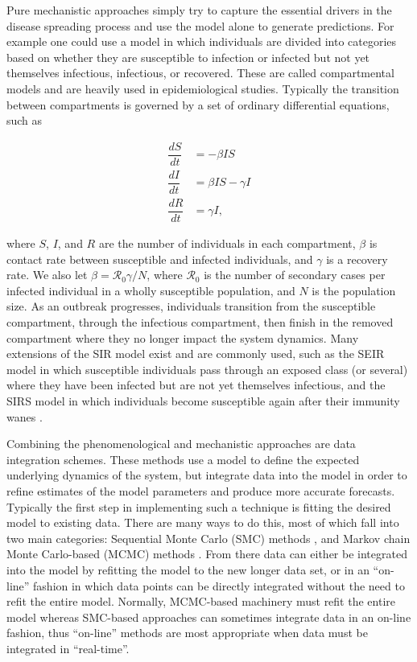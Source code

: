 Pure mechanistic approaches simply try to capture the essential drivers in the disease spreading process and use the model alone to generate predictions. For example one could use a model in which individuals are divided into categories based on whether they are susceptible to infection or infected but not yet themselves infectious, infectious, or recovered. These are called compartmental models and are heavily used in epidemiological studies. Typically the transition between compartments is governed by a set of ordinary differential equations, such as 

\begin{equation}\label{sirode}
    \begin{array}{rl}
        \dfrac{dS}{dt} & = - \beta I S \\
        \dfrac{dI}{dt} & = \beta I S - \gamma I  \\
        \dfrac{dR}{dt} & = \gamma I,
    \end{array}
\end{equation}

where $S$, $I$, and $R$ are the number of individuals in each compartment, $\beta$ is contact rate between susceptible and infected individuals, and $\gamma$ is a recovery rate. We also let $\beta = \mathcal{R}_0 \gamma / N$, where $\mathcal{R}_0$ is the number of secondary cases per infected individual in a wholly susceptible population, and $N$ is the population size. As an outbreak progresses, individuals transition from the susceptible compartment, through the infectious compartment, then finish in the removed compartment where they no longer impact the system dynamics. Many extensions of the SIR model exist and are commonly used, such as the SEIR model in which susceptible individuals pass through an exposed class (or several) where they have been infected but are not yet themselves infectious, and the SIRS model in which individuals become susceptible again after their immunity wanes \cite{Camacho2011}\cite{Dushoff2004}.

Combining the phenomenological and mechanistic approaches are data integration schemes. These methods use a model to define the expected underlying dynamics of the system, but integrate data into the model in order to refine estimates of the model parameters and produce more accurate forecasts. Typically the first step in implementing such a technique is fitting the desired model to existing data. There are many ways to do this, most of which fall into two main categories: Sequential Monte Carlo (SMC) methods \cite{Arulampalam2002}\cite{Sau1918}\cite{Yang2014}, and Markov chain Monte Carlo-based (MCMC) methods \cite{Andrieu2003}\cite{Neal2011}. From there data can either be integrated into the model by refitting the model to the new longer data set, or in an ``on-line'' fashion in which data points can be directly integrated without the need to refit the entire model. Normally, MCMC-based machinery must refit the entire model whereas SMC-based approaches can sometimes integrate data in an on-line fashion, thus ``on-line'' methods are most appropriate when data must be integrated in ``real-time''.

